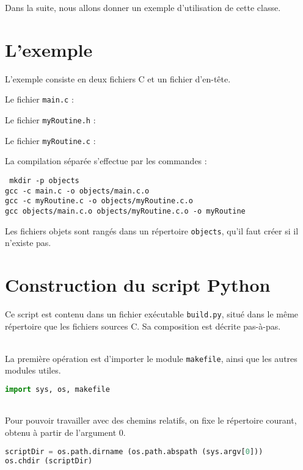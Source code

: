 \documentclass[a4paper,11pt]{extarticle}
\begin{document}
Dans la suite, nous allons donner un exemple d'utilisation de cette classe.

\section{L'exemple}

L'exemple consiste en deux fichiers C et un fichier d'en-tête.

Le fichier \texttt{main.c} :



Le fichier \texttt{myRoutine.h} :



Le fichier \texttt{myRoutine.c} :


La compilation séparée s'effectue par les commandes :

\begin{mdframed}[hidealllines=true,backgroundcolor=lightgray!20]
\tt\footnotesize
mkdir -p objects\\
gcc -c main.c -o objects/main.c.o\\
gcc -c myRoutine.c -o objects/myRoutine.c.o\\
gcc objects/main.c.o objects/myRoutine.c.o -o myRoutine
\end{mdframed}


Les fichiers objets sont rangés dans un répertoire \texttt{objects}, qu'il faut créer si il n'existe pas.


\section{Construction du script Python}

Ce script est contenu dans un fichier exécutable \texttt{build.py}, situé dans le même répertoire que les fichiers sources C. Sa composition est décrite pas-à-pas.

~\\La première opération est d'importer le module \texttt{makefile}, ainsi que les autres modules utiles.
\begin{lstlisting}[language=py]
import sys, os, makefile
\end{lstlisting}

~\\Pour pouvoir travailler avec des chemins relatifs, on fixe le répertoire courant, obtenu à partir de l'argument $0$.
\begin{lstlisting}[language=py]
scriptDir = os.path.dirname (os.path.abspath (sys.argv[0]))
os.chdir (scriptDir)
\end{lstlisting}
\end{document}
